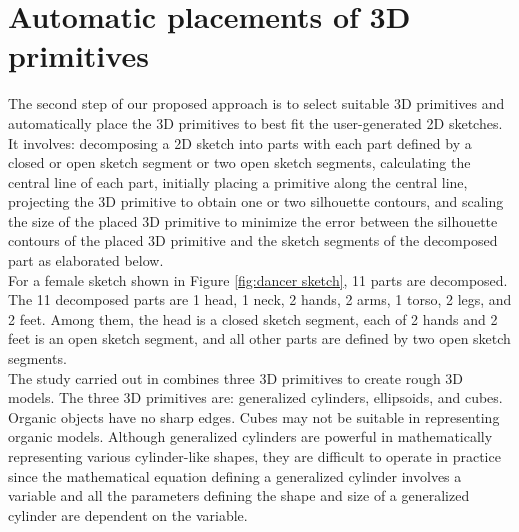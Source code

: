 \documentclass[runningheads]{llncs}
\begin{document}
\section{Automatic placements of 3D primitives}\label{Automatic placements of 3D primitives}
The second step of our proposed approach is to select suitable 3D primitives and automatically place the 3D primitives to best fit the user-generated 2D sketches. It involves: decomposing a 2D sketch into parts with each part defined by a closed or open sketch segment or two open sketch segments, calculating the central line of each part, initially placing a primitive along the central line, projecting the 3D primitive to obtain one or two silhouette contours, and scaling the size of the placed 3D primitive to minimize the error between the silhouette contours of the placed 3D primitive and the sketch segments of the decomposed part as elaborated below.\\

For a female sketch shown in Figure \ref{fig:dancer sketch}, 11 parts are decomposed. The 11 decomposed parts are 1 head, 1 neck, 2 hands, 2 arms, 1 torso, 2 legs, and 2 feet. Among them, the head is a closed sketch segment, each of 2 hands and 2 feet is an open sketch segment, and all other parts are defined by two open sketch segments.\\

The study carried out in \cite{Kazmi2016A} combines three 3D primitives to create rough 3D models. The three 3D primitives are: generalized cylinders, ellipsoids, and cubes. Organic objects have no sharp edges. Cubes may not be suitable in representing organic models. Although generalized cylinders are powerful in mathematically representing various cylinder-like shapes, they are difficult to operate in practice since the mathematical equation defining a generalized cylinder involves a variable and all the parameters defining the shape and size of a generalized cylinder are dependent on the variable. \\
\end{document}
